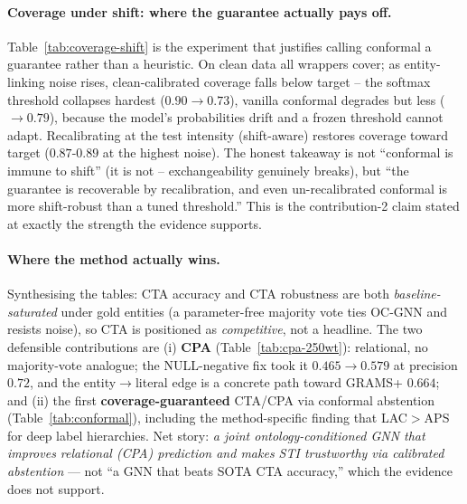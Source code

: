 \paragraph{Coverage under shift: where the guarantee actually pays off.}
Table~\ref{tab:coverage-shift} is the experiment that justifies calling conformal
a guarantee rather than a heuristic. On clean data all wrappers cover; as entity-
linking noise rises, clean-calibrated coverage falls below target -- the softmax
threshold collapses hardest ($0.90\!\to\!0.73$), vanilla conformal degrades but
less ($\to\!0.79$), because the model's probabilities drift and a frozen threshold
cannot adapt. Recalibrating at the test intensity (shift-aware) restores coverage
toward target ($0.87$-$0.89$ at the highest noise). The honest takeaway is not
``conformal is immune to shift'' (it is not -- exchangeability genuinely breaks),
but ``the guarantee is recoverable by recalibration, and even un-recalibrated
conformal is more shift-robust than a tuned threshold.'' This is the contribution-2
claim stated at exactly the strength the evidence supports.

\paragraph{Where the method actually wins.} Synthesising the tables: CTA accuracy
and CTA robustness are both \emph{baseline-saturated} under gold entities (a
parameter-free majority vote ties OC-GNN and resists noise), so CTA is positioned
as \emph{competitive}, not a headline. The two defensible contributions are
(i) \textbf{CPA} (Table~\ref{tab:cpa-250wt}): relational, no majority-vote
analogue; the NULL-negative fix took it $0.465\!\to\!0.579$ at precision $0.72$,
and the entity$\to$literal edge is a concrete path toward GRAMS+ $0.664$; and
(ii) the first \textbf{coverage-guaranteed} CTA/CPA via conformal abstention
(Table~\ref{tab:conformal}), including the method-specific finding that LAC$>$APS
for deep label hierarchies. Net story: \emph{a joint ontology-conditioned GNN that
improves relational (CPA) prediction and makes STI trustworthy via calibrated
abstention} --- not ``a GNN that beats SOTA CTA accuracy,'' which the evidence does
not support.
